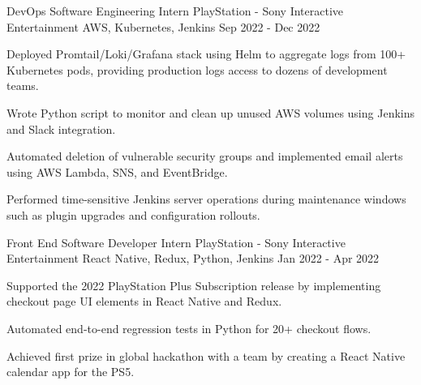 

\begin{cventries}

  \cventry
    {DevOps Software Engineering Intern} %
    {PlayStation - Sony Interactive Entertainment} %
    {AWS, Kubernetes, Jenkins} %
    {Sep 2022 - Dec 2022} %
    {
      \begin{cvitems} %
        \item {Deployed {Promtail/Loki/Grafana} stack using {Helm} to aggregate logs from 100+ {Kubernetes} pods, providing production logs access to dozens of development teams.}
        \item {Wrote Python script to monitor and clean up unused AWS volumes using {Jenkins} and Slack integration.}
        \item {Automated deletion of vulnerable security groups and implemented email alerts using AWS Lambda, SNS, and EventBridge.}
        \item {Performed {time-sensitive} Jenkins server operations during maintenance windows such as plugin upgrades and configuration rollouts.}
      \end{cvitems}
    }

  \cventry
    {Front End Software Developer Intern} %
    {PlayStation - Sony Interactive Entertainment} %
    {React Native, Redux, Python, Jenkins} %
    {Jan 2022 - Apr 2022} %
    {
      \begin{cvitems} %
        \item {Supported the 2022 PlayStation Plus Subscription release by implementing checkout page UI elements in {React Native} and {Redux}.}
        \item {Automated end-to-end regression tests in {Python} for 20+ checkout flows.} 
        \item {Achieved {first prize} in global hackathon with a team by creating a React Native calendar app for the PS5.}
      \end{cvitems}
    }


\end{cventries}
